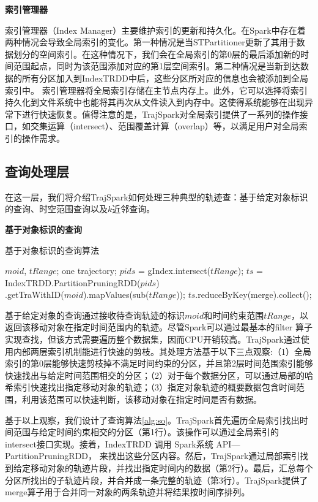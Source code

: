 \textbf{索引管理器}

索引管理器（Index Manager）主要维护索引的更新和持久化。在Spark中存在着两种情况会导致全局索引的变化。第一种情况是当STPartitioner更新了其用于数据划分的空间索引。在这种情况下，我们会在全局索引的第0层的最后添加新的时间范围起点，同时为该范围添加对应的第1层空间索引。第二种情况是当新到达数据的所有分区加入到IndexTRDD中后，这些分区所对应的信息也会被添加到全局索引中。
索引管理器将全局索引存储在主节点内存上。此外，它可以选择将索引持久化到文件系统中也能将其再次从文件读入到内存中。这使得系统能够在出现异常下进行快速恢复。值得注意的是，TrajSpark对全局索引提供了一系列的操作接口，如交集运算（intersect）、范围覆盖计算（overlap）等，以满足用户对全局索引的操作需求。

\subsection{查询处理层}
在这一层，我们将介绍TrajSpark如何处理三种典型的轨迹查：基于给定对象标识的查询、时空范围查询以及$k$近邻查询。

\textbf{基于对象标识的查询}

\begin{algorithm}[t]    %
	\setlength{\abovedisplayskip}{8pt}
	\setlength{\belowdisplayskip}{8pt}
	\caption{基于对象标识的查询算法}   %
	\label{alg:so}       %
	\begin{algorithmic}[1] 
		\REQUIRE $moid$, $tRange$;
		\ENSURE one trajectory;
		\STATE $pids$ = gIndex.intersect($tRange$);
		\STATE $ts$ = IndexTRDD.PartitionPruningRDD($pids$)\\
		\qquad \qquad \qquad \qquad .getTraWithID($moid$).mapValues(sub($tRange$));
		\RETURN 	  $ts$.reduceByKey(merge).collect();
	\end{algorithmic}
\end{algorithm}	 

基于给定对象的查询通过接收待查询轨迹的标识$moid$和时间约束范围$tRange$，以返回该移动对象在指定时间范围内的轨迹。尽管Spark可以通过最基本的filter 算子实现查找，但该方式需要遍历整个数据集，因而CPU开销较高。TrajSpark通过使用内部两层索引机制能进行快速的剪枝。其处理方法基于以下三点观察:（1）全局索引的第0层能够快速剪枝掉不满足时间约束的分区，并且第2层时间范围索引能够快速找出与给定时间范围相交的分区；（2）对于每个数据分区，可以通过局部的哈希索引快速找出指定移动对象的轨迹；（3）指定对象轨迹的概要数据包含时间范围，利用该范围可以快速判断，该移动对象在指定时间是否有数据。

基于以上观察，我们设计了查询算法\ref{alg:so}。TrajSpark首先遍历全局索引找出时间范围与给定时间约束相交的分区（第1行）。该操作可以通过全局索引的 intersect接口实现。接着，IndexTRDD 调用 Spark系统 API--- PartitionPruningRDD， 来找出这些分区内容。然后，TrajSpark通过局部索引找到给定移动对象的轨迹片段，并找出指定时间内的数据（第2行）。最后，汇总每个分区所找出的子轨迹片段，并合并成一条完整的轨迹（第3行）。TrajSpark提供了merge算子用于合并同一对象的两条轨迹并将结果按时间序排列。


